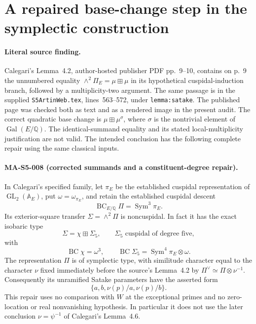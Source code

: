 \section{A repaired base-change step in the symplectic construction}
\label{sec:s5-symplectic-source-repair}

\paragraph{Literal source finding.}
Calegari's Lemma~4.2, author-hosted publisher PDF pp.~9--10,
contains on p.~9 the unnumbered equality
$\wedge^2\Pi_E=\mu\boxplus\mu$ in its hypothetical
cuspidal-induction branch, followed by a multiplicity-two
argument.  The same passage is in the supplied
\texttt{S5ArtinWeb.tex}, lines~563--572, under
\texttt{lemma:satake}.  The published page was checked
both as text and as a rendered image in the present audit.
The correct quadratic base change is
$\mu\boxplus\mu^\sigma$, where $\sigma$ is the nontrivial
element of $\operatorname{Gal}(E/\mathbb Q)$.
The identical-summand equality and its stated local-multiplicity
justification are not valid.  The intended conclusion has the
following complete repair using the same classical inputs.

\paragraph{MA-S5-008 (corrected summands and a constituent-degree repair).}
In Calegari's specified family, let $\pi_E$ be the established
cuspidal representation of $\operatorname{GL}_2(\mathbb A_E)$,
put $\omega=\omega_{\pi_E}$, and retain the established cuspidal
descent
\[
 \operatorname{BC}_{E/\mathbb Q}\Pi
        =\operatorname{Sym}^3\pi_E.
 \tag{MA-S5.40}
\]
Its exterior-square transfer $\Sigma=\wedge^2\Pi$ is
noncuspidal.  In fact it has the exact isobaric type
\[
 \Sigma=\chi\boxplus\Sigma_5,
 \qquad \Sigma_5\text{ cuspidal of degree five},
 \tag{MA-S5.41}
\]
with
\[
 \operatorname{BC}\chi=\omega^3,
 \qquad
 \operatorname{BC}\Sigma_5=\operatorname{Sym}^4\pi_E\otimes\omega.
 \tag{MA-S5.42}
\]
The representation $\Pi$ is of symplectic type, with similitude
character equal to the character $\nu$ fixed immediately before
the source's Lemma~4.2 by $\Pi^\vee\simeq\Pi\otimes\nu^{-1}$.
Consequently its unramified Satake parameters have the asserted
form
\[
                         \{a,b,\nu(p)/a,\nu(p)/b\}.
 \tag{MA-S5.43}
\]
This repair uses no comparison with $W$ at the exceptional
primes and no zero-location or real nonvanishing hypothesis.
In particular it does not use the later conclusion
$\nu=\psi^{-1}$ of Calegari's Lemma~4.6.

